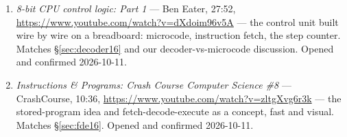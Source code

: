 \begin{rulebox}
\begin{enumerate}
\item \emph{8-bit CPU control logic: Part 1} --- Ben Eater, 27:52,
\url{https://www.youtube.com/watch?v=dXdoim96v5A} --- the control
unit built wire by wire on a breadboard: microcode, instruction
fetch, the step counter. Matches \S\ref{sec:decoder16} and our
decoder-vs-microcode discussion. Opened and confirmed 2026-10-11.
\item \emph{Instructions \& Programs: Crash Course Computer
Science \#8} --- CrashCourse, 10:36,
\url{https://www.youtube.com/watch?v=zltgXvg6r3k} --- the stored-program
idea and fetch-decode-execute as a concept, fast and visual. Matches
\S\ref{sec:fde16}. Opened and confirmed 2026-10-11.
\end{enumerate}
\end{rulebox}

